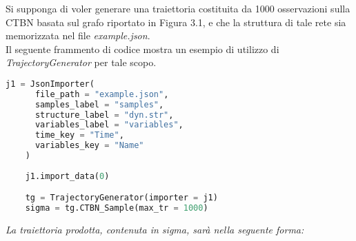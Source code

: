   \begin{exmp}
    Si supponga di voler generare una traiettoria costituita da 1000 osservazioni sulla CTBN basata sul grafo riportato in Figura 3.1,
    e che la struttura di tale rete sia memorizzata nel file \emph{example.json}.\\
    Il seguente frammento di codice mostra un esempio di utilizzo di \emph{TrajectoryGenerator} per tale
    scopo.
  \end{exmp}

  \begin{lstlisting}[language=python]
    j1 = JsonImporter(
      file_path = "example.json", 
      samples_label = "samples",
      structure_label = "dyn.str", 
      variables_label = "variables",
      time_key = "Time",
      variables_key = "Name"
    )
    
    j1.import_data(0)

    tg = TrajectoryGenerator(importer = j1)
    sigma = tg.CTBN_Sample(max_tr = 1000)
  \end{lstlisting}

  \textit{La traiettoria prodotta, contenuta in \emph{sigma}, sarà nella seguente forma:}

